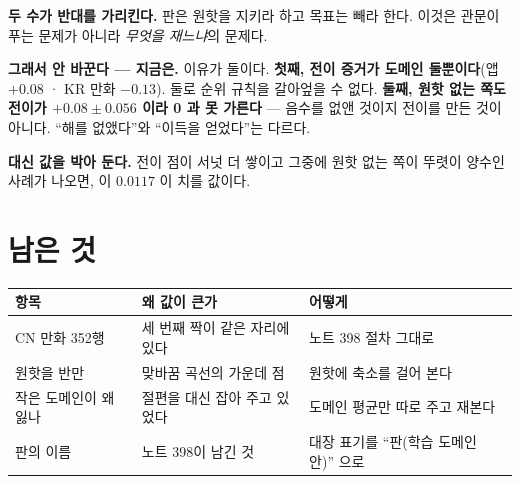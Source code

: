 \documentclass[11pt]{article}
\begin{document}
\textbf{두 수가 반대를 가리킨다.} 판은 원핫을 지키라 하고 목표는 빼라 한다.
이것은 관문이 푸는 문제가 아니라 \emph{무엇을 재느냐}의 문제다.

\textbf{그래서 안 바꾼다 --- 지금은.} 이유가 둘이다. \textbf{첫째, 전이
증거가 도메인 둘뿐이다}(앱 $+0.08$ · KR 만화 $-0.13$). 둘로 순위 규칙을
갈아엎을 수 없다. \textbf{둘째, 원핫 없는 쪽도 전이가 $+0.08 \pm 0.056$
이라 0 과 못 가른다} --- 음수를 없앤 것이지 전이를 만든 것이 아니다.
``해를 없앴다''와 ``이득을 얻었다''는 다르다.

\textbf{대신 값을 박아 둔다.} 전이 점이 서넛 더 쌓이고 그중에 원핫 없는
쪽이 뚜렷이 양수인 사례가 나오면, 이 $0.0117$ 이 치를 값이다.

\section{남은 것}

\begin{center}
\begin{tabular}{lll}
\hline
항목 & 왜 값이 큰가 & 어떻게 \\
\hline
CN 만화 352행 & 세 번째 짝이 같은 자리에 있다 & 노트 398 절차 그대로 \\
원핫을 반만 & 맞바꿈 곡선의 가운데 점 & 원핫에 축소를 걸어 본다 \\
작은 도메인이 왜 잃나 & 절편을 대신 잡아 주고 있었다 & 도메인 평균만 따로 주고 재본다 \\
판의 이름 & 노트 398이 남긴 것 & 대장 표기를 ``판(학습 도메인 안)'' 으로 \\
\hline
\end{tabular}
\end{center}
\end{document}
